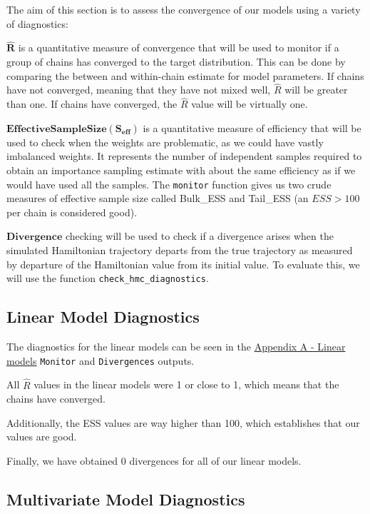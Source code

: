 \documentclass[
]{article}
\begin{document}
The aim of this section is to assess the convergence of our models using
a variety of diagnostics:

\(\mathbf{\hat{R}}\) is a quantitative measure of convergence that will
be used to monitor if a group of chains has converged to the target
distribution. This can be done by comparing the between and within-chain
estimate for model parameters. If chains have not converged, meaning
that they have not mixed well, \(\hat{R}\) will be greater than one. If
chains have converged, the \(\hat{R}\) value will be virtually one.

\(\mathbf{Effective Sample Size (S_{eff})}\) is a quantitative measure
of efficiency that will be used to check when the weights are
problematic, as we could have vastly imbalanced weights. It represents
the number of independent samples required to obtain an importance
sampling estimate with about the same efficiency as if we would have
used all the samples. The \texttt{monitor} function gives us two crude
measures of effective sample size called Bulk\_ESS and Tail\_ESS (an
\(ESS > 100\) per chain is considered good).

\(\mathbf{Divergence}\) checking will be used to check if a divergence
arises when the simulated Hamiltonian trajectory departs from the true
trajectory as measured by departure of the Hamiltonian value from its
initial value. To evaluate this, we will use the function
\texttt{check\_hmc\_diagnostics}.

\hypertarget{linear-model-diagnostics}{%
\subsection{Linear Model Diagnostics}\label{linear-model-diagnostics}}

The diagnostics for the linear models can be seen in the
\protect\hyperlink{apa}{Appendix A - Linear models} \texttt{Monitor} and
\texttt{Divergences} outputs.

All \(\hat{R}\) values in the linear models were 1 or close to 1, which
means that the chains have converged.

Additionally, the ESS values are way higher than 100, which establishes
that our values are good.

Finally, we have obtained 0 divergences for all of our linear models.

\hypertarget{multivariate-model-diagnostics}{%
\subsection{Multivariate Model
Diagnostics}\label{multivariate-model-diagnostics}}
\end{document}
